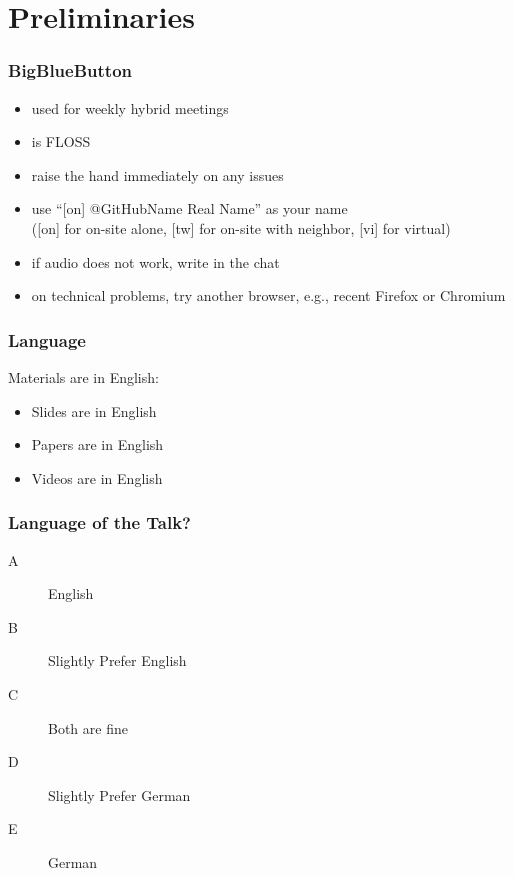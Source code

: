 

\title{\mylecture}



\section{Preliminaries}

\begin{frame}
	\frametitle{BigBlueButton}
	\begin{itemize}[<+-| alert@+>]
		\item used for weekly hybrid meetings
		\item is FLOSS
		\item raise the hand immediately on any issues
		\item use ``[on] @GitHubName Real Name'' as your name \\
			([on] for on-site alone, [tw] for on-site with neighbor, [vi] for virtual)
		\item if audio does not work, write in the chat
		\item on technical problems, try another browser, e.g., recent Firefox or Chromium
	\end{itemize}
\end{frame}

\begin{frame}
	\frametitle{Language}
	Materials are in English:
	\begin{itemize}
		\item Slides are in English
		\item Papers are in English
		\item Videos are in English
	\end{itemize}
\end{frame}

\begin{assignment}
	\frametitle{Language of the Talk?}
	\begin{task}
	\begin{description}
	\item[A] English
	\item[B] Slightly Prefer English
	\item[C] Both are fine
	\item[D] Slightly Prefer German
	\item[E] German
	\end{description}
	\end{task}
\end{assignment}

